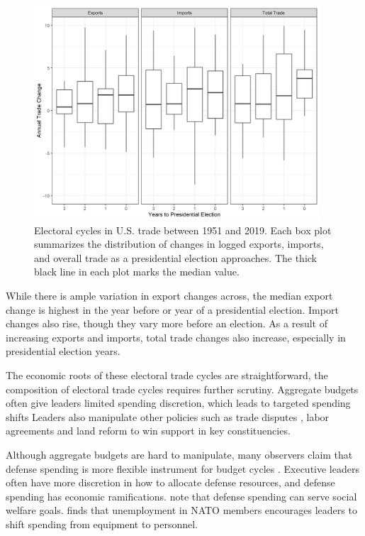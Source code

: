 \documentclass[12pt]{article}
\begin{document}
\begin{figure}
\centering
\includegraphics[width=0.95\textwidth]{../figures/us-trade-cycles.png}
\caption{Electoral cycles in U.S. trade between 1951 and 2019. Each box plot summarizes the distribution of changes in logged exports, imports, and overall trade as a presidential election approaches. The thick black line in each plot marks the median value.}
\label{fig:us-trade-cycles}
\end{figure}


While there is ample variation in export changes across, the median export change is highest in the year before or year of a presidential election.
Import changes also rise, though they vary more before an election. 
As a result of increasing exports and imports, total trade changes also increase, especially in presidential election years.


The economic roots of these electoral trade cycles are straightforward, the composition of electoral trade cycles requires further scrutiny.
Aggregate budgets often give leaders limited spending discretion, which leads to targeted spending shifts \citep[pg. 248]{Dubois2016}
Leaders also manipulate other policies such as trade disputes \citep{Conconietal2017}, labor agreements \citep{Ahlquist2010} and land reform \cite{Philips2020} to win support in key constituencies.


Although aggregate budgets are hard to manipulate, many observers claim that defense spending is more flexible instrument for budget cycles \citep{Tufte1978, Mintz1988}.
Executive leaders often have more discretion in how to allocate defense resources, and defense spending has economic ramifications.
\citet{WhittenWilliams2011} note that defense spending can serve social welfare goals. 
\citet{Becker2021} finds that unemployment in NATO members encourages leaders to shift spending from equipment to personnel.
\end{document}
